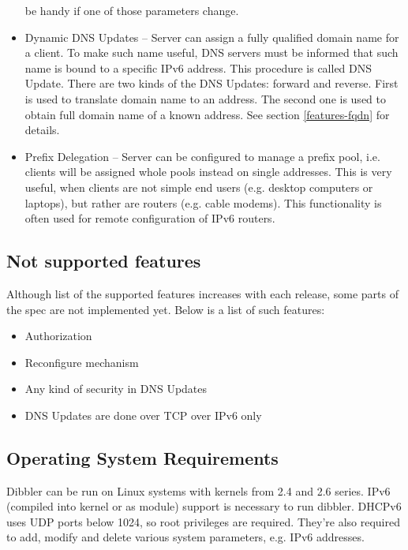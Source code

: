 \begin{itemize}
      be handy if one of those parameters change. \cite{rfc4242}
\item Dynamic DNS Updates -- Server can assign a fully qualified
      domain name for a client. To make such name useful, DNS servers
      must be informed that such name is bound to a specific IPv6
      address. This procedure is called DNS Update. There are two kinds
      of the DNS Updates: forward and reverse. First is used to
      translate domain name to an address. The second one is used to
      obtain full domain name of a known address. See section
      \ref{features-fqdn} for details. \cite{rfc4704}
\item Prefix Delegation -- Server can be configured to manage a prefix
      pool, i.e. clients will be assigned whole pools instead on
      single addresses. This is very useful, when clients are not
      simple end users (e.g. desktop computers or laptops), but rather
      are routers (e.g. cable modems). This functionality is often
      used for remote configuration of IPv6 routers. \cite{rfc3633}
\end{itemize}

\subsection{Not supported features}
Although list of the supported features increases with each release,
some parts of the spec are not implemented yet. Below is a list of such
features:

\begin{itemize}
 \item Authorization \cite{rfc3315}
 \item Reconfigure mechanism \cite{rfc3315}
 \item Any kind of security in DNS Updates \cite{rfc4704}
 \item DNS Updates are done over TCP over IPv6 only
\end{itemize}

\subsection{Operating System Requirements}
\label{requirements}
Dibbler can be run on Linux systems with kernels from 2.4 and 2.6
series. IPv6 (compiled into kernel or as module) support is necessary
to run dibbler. DHCPv6 uses UDP ports below 1024, so root privileges
are required. They're also required to add, modify and delete various
system parameters, e.g. IPv6 addresses.

